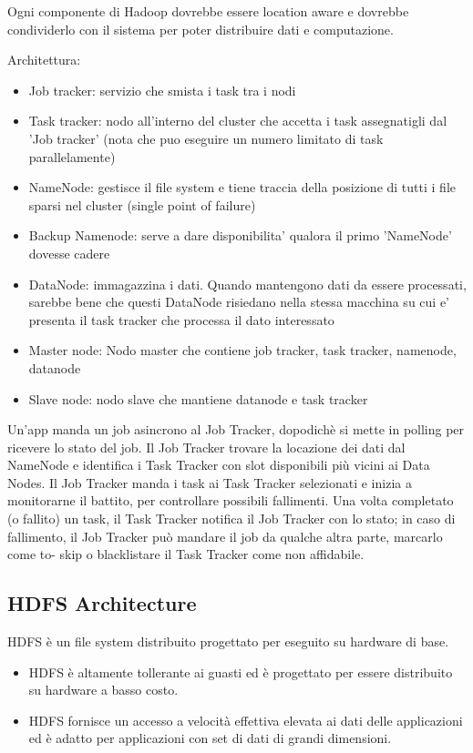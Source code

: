 \documentclass{article}
\begin{document}
Ogni componente di Hadoop dovrebbe essere location aware e dovrebbe condividerlo con il sistema per poter distribuire dati e computazione.

Architettura:
\begin{itemize}
    \item Job tracker: servizio che smista i task tra i nodi
    \item Task tracker: nodo all'interno del cluster che accetta i task assegnatigli dal 'Job tracker' (nota che puo eseguire un numero limitato di task parallelamente)
    \item NameNode: gestisce il file system e tiene traccia della posizione di tutti i file sparsi nel cluster (single point of failure)
    \item Backup Namenode: serve a dare disponibilita' qualora il primo 'NameNode' dovesse cadere
    \item DataNode: immagazzina i dati. Quando mantengono dati da essere processati, sarebbe bene che questi DataNode risiedano nella stessa macchina su cui e' presenta il task tracker che processa il dato interessato
    \item Master node: Nodo master che contiene job tracker, task tracker, namenode, datanode
    \item Slave node: nodo slave che mantiene datanode e task tracker
\end{itemize}

Un’app manda un job asincrono al Job Tracker, dopodichè si mette in polling per ricevere lo stato del job. Il Job Tracker trovare la locazione dei dati dal NameNode e identifica i Task Tracker con slot disponibili più vicini ai Data Nodes.
Il Job Tracker manda i task ai Task Tracker selezionati e inizia a monitorarne il battito, per controllare possibili fallimenti. Una volta completato (o fallito) un task, il Task Tracker notifica il Job Tracker con lo stato; in caso di fallimento, il Job Tracker può mandare il job da qualche altra parte, marcarlo come to- skip o blacklistare il Task Tracker come non affidabile.

\subsection{HDFS Architecture}
HDFS è un file system distribuito progettato per
eseguito su hardware di base. 
\begin{itemize}
    \item HDFS è altamente tollerante ai guasti ed è progettato per essere distribuito su hardware a basso costo.
    \item HDFS fornisce un accesso a velocità effettiva elevata ai dati delle applicazioni ed è adatto per applicazioni con set di dati di grandi dimensioni.
\end{itemize}
\end{document}
